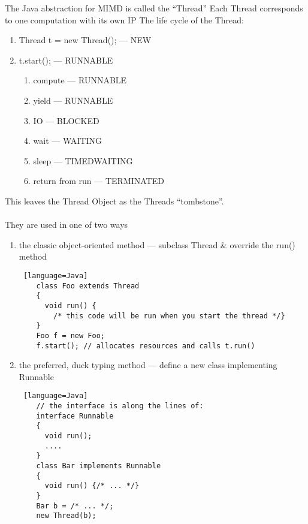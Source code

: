 \documentclass[../../lecture_notes.tex]{subfiles}
\begin{document}
The Java abstraction for MIMD is called the “Thread”
Each Thread corresponds to one computation with its own IP
The life cycle of the Thread:
\begin{enumerate} [itemsep=0mm]
	\item Thread t = new Thread(); — NEW
	\item t.start(); — RUNNABLE
	\begin{enumerate} [itemsep=0mm]
		\item compute — RUNNABLE
		\item yield — RUNNABLE
		\item IO — BLOCKED
		\item wait — WAITING
		\item sleep — TIMEDWAITING
		\item return from run — TERMINATED
	\end{enumerate}
\end{enumerate}
This leaves the Thread Object as the Threads “tombstone”.\\
\\
They are used in one of two ways
\begin{enumerate} [itemsep=0mm]
	\item the classic object-oriented method — subclass Thread \& override the run() method
		\begin{lstlisting} [language=Java]
	class Foo extends Thread
	{
	  void run() {
	    /* this code will be run when you start the thread */}
	}
	Foo f = new Foo;
	f.start(); // allocates resources and calls t.run()
		\end{lstlisting}
	\item the preferred, duck typing method — define a new class implementing Runnable
		\begin{lstlisting} [language=Java]
	// the interface is along the lines of:
	interface Runnable 
	{
	  void run();
	  ....
	}
	class Bar implements Runnable
	{
	  void run() {/* ... */}
	}
	Bar b = /* ... */;
	new Thread(b);
	\end{lstlisting}
\end{enumerate} \medskip
\end{document}
